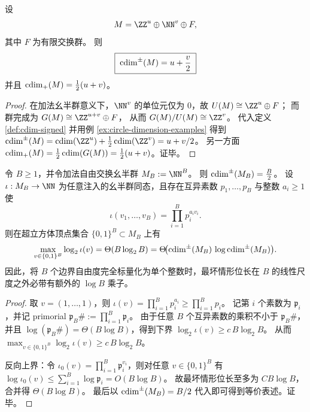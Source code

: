\begin{proposition}[正交幺半群的闭式计算]\label{prop:cdim-signed-orthant-closed}
设
\[
M=\ZZ^{u}\oplus \NN^{v}\oplus F,
\]
其中 \(F\) 为有限交换群。
则
\[
\boxed{\;\operatorname{cdim}^{\pm}(M)=u+\frac{v}{2}\;}
\]
并且 \(\operatorname{cdim}_{+}(M)=\frac12(u+v)\)。
\end{proposition}
\begin{proof}
在加法幺半群意义下，\(\NN^{v}\) 的单位元仅为 \(0\)，故
\(
U(M)\cong \ZZ^{u}\oplus F
\)；
而群完成为
\(
G(M)\cong \ZZ^{u+v}\oplus F
\)，
从而
\(
G(M)/U(M)\cong \ZZ^{v}
\)。
代入定义 \ref{def:cdim-signed} 并用例 \ref{ex:circle-dimension-examples} 得到
\(
\cdim^{\pm}(M)=\cdim(\ZZ^{u})+\frac12\cdim(\ZZ^{v})=u+v/2
\)。
另一方面 \(\operatorname{cdim}_{+}(M)=\frac12\operatorname{cdim}(G(M))=\frac12(u+v)\)。证毕。
\end{proof}

\begin{proposition}\label{prop:cdim-godel-scalarization-bitlength-logB}
令 \(B\ge 1\)，并令加法自由交换幺半群 \(M_B:=\NN^{B}\)。
则 \(\operatorname{cdim}^{\pm}(M_B)=\frac{B}{2}\)。
设 \(\iota:M_B\to \NN\) 为任意注入的幺半群同态，且存在互异素数 \(p_1,\dots,p_B\) 与整数 \(a_i\ge 1\) 使
\[
\iota(v_1,\dots,v_B)=\prod_{i=1}^{B}p_i^{a_i v_i}.
\]
则在超立方体顶点集合 \(\{0,1\}^{B}\subset M_B\) 上有
\[
\max_{v\in\{0,1\}^B}\log_2\iota(v)=\Theta(B\log_2 B)
=\Theta\!\bigl(\operatorname{cdim}^{\pm}(M_B)\,\log \operatorname{cdim}^{\pm}(M_B)\bigr).
\]
因此，将 \(B\) 个边界自由度完全标量化为单个整数时，最坏情形位长在 \(B\) 的线性尺度之外必带有额外的 \(\log B\) 乘子。
\end{proposition}
\begin{proof}
取 \(v=(1,\dots,1)\)，则
\(
\iota(v)=\prod_{i=1}^{B}p_i^{a_i}\ge \prod_{i=1}^{B}p_i
\)。
记第 \(i\) 个素数为 \(\mathfrak p_i\)，并记 primorial \(\mathfrak p_B\#:=\prod_{i=1}^{B}\mathfrak p_i\)。
由于任意 \(B\) 个互异素数的乘积不小于 \(\mathfrak p_B\#\)，并且 \(\log(\mathfrak p_B\#)=\Theta(B\log B)\)，得到下界
\(
\log_2\iota(v)\ge c\,B\log_2 B
\)。
从而 \(\max_{v\in\{0,1\}^B}\log_2\iota(v)\ge c\,B\log_2 B\)。
\par
反向上界：令 \(\iota_0(v)=\prod_{i=1}^{B}\mathfrak p_i^{v_i}\)，则对任意 \(v\in\{0,1\}^B\) 有
\(
\log \iota_0(v)\le \sum_{i=1}^{B}\log \mathfrak p_i=O(B\log B)
\)。
故最坏情形位长至多为 \(C B\log B\)，合并得 \(\Theta(B\log B)\)。
最后以 \(\operatorname{cdim}^{\pm}(M_B)=B/2\) 代入即可得到等价表述。证毕。
\end{proof}

